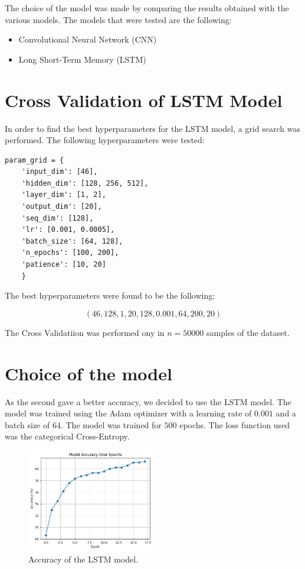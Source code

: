 \documentclass{article}
\begin{document}
The choice of the model was made by comparing the results obtained with the various models. The models that were tested are the following:
\begin{itemize}
    \item Convolutional Neural Network (CNN)
    \item Long Short-Term Memory (LSTM)
\end{itemize}

\section{Cross Validation of LSTM Model}

In order to find the best hyperparameters for the LSTM model, a grid search was performed. The following hyperparameters were tested:

\begin{lstlisting}[caption={Hyperparameters}, label={lst:example}]
    param_grid = {
    'input_dim': [46],
    'hidden_dim': [128, 256, 512],
    'layer_dim': [1, 2],
    'output_dim': [20],
    'seq_dim': [128],
    'lr': [0.001, 0.0005],
    'batch_size': [64, 128],
    'n_epochs': [100, 200],
    'patience': [10, 20]
    }
\end{lstlisting}

The best hyperparameters were found to be the following:

\[
    (46, 128, 1, 20, 128, 0.001, 64, 200, 20)
\]

The Cross Validatiion was performed ony in $n = 50000$ samples of the dataset. 


\section{Choice of the model}
\label{sec:model}

As the second gave a better accuracy, we decided to use the LSTM model. The model was trained using the Adam optimizer with a learning rate of $0.001$ and a batch size of $64$. The model was trained for $500$ epochs. The loss function used was the categorical Cross-Entropy.

\begin{figure}[htpb!]
    \centering
    \includegraphics[width=0.5\textwidth]{accuracy.png}
    \caption{Accuracy of the LSTM model.}
    \label{fig:loss}
\end{figure}
\end{document}
